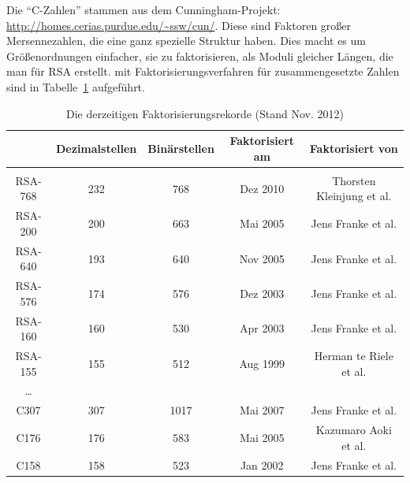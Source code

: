 \begin{refsegment}
{Die "`C-Zahlen"' stammen aus dem Cunningham-Projekt:
\url{http://homes.cerias.purdue.edu/~ssw/cun/}.
Diese sind Faktoren großer Mersennezahlen, die eine ganz spezielle
Struktur haben. Dies macht es um Größenordnungen einfacher, sie zu
faktorisieren, als Moduli gleicher Längen, die man für RSA erstellt.
                               }
mit Faktorisierungsverfahren für zusammengesetzte Zahlen
sind in Tabelle~\ref{factorizationrecords} aufgeführt.


\begin{table}[ht]
\begin{center}
\begin{tabular}{|c|ccc@{}c|}
\hline
   & {\bf Dezimalstellen} & {\bf Binärstellen} & {\bf Faktorisiert am} & {\bf Faktorisiert von}\\
\hline
	&&&&\\
	RSA-768 & 	232 & 768 & Dez 2010 & Thorsten Kleinjung et al.\\
	RSA-200 & 	200 & 663 & Mai 2005 & Jens Franke et al.\\
	RSA-640\footnotemark & 	193 & 640 & Nov 2005 & Jens Franke et al.\\
	RSA-576 & 	174 & 576 & Dez 2003 & Jens Franke et al.\\
	RSA-160 & 	160 & 530 & Apr 2003 & Jens Franke et al.\\
	RSA-155	&	155 & 512 & Aug 1999 & Herman te Riele et al.\\
	\dots & & & &\\
	C307 & 		307 & 1017 & Mai 2007 & Jens Franke et al.\\
	C176 & 		176 & 583 & Mai 2005 & Kazumaro Aoki et al.\\
	C158 & 		158 & 523 & Jan 2002 & Jens Franke et al.\\
\hline
\end{tabular}
\caption{Die derzeitigen Faktorisierungsrekorde (Stand Nov. 2012)}  %
\label{factorizationrecords}
\end{center}
\end{table}
\end{refsegment}
